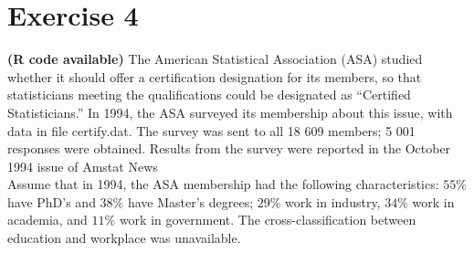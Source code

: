 \documentclass[12pt]{article}
\begin{document}
\section*{Exercise 4}
\textbf{\color{ForestGreen}(R code available)} The American Statistical Association (ASA) studied whether it should offer a certification designation for its members, so that statisticians meeting the qualifications
could be designated as “Certified Statisticians.” In 1994, the ASA surveyed its membership about this issue, with data in file certify.dat. The survey was sent to all 18 609
members; 5 001 responses were obtained. Results from the survey were reported in the October 1994 issue of Amstat News\\
Assume that in 1994, the ASA membership had the following characteristics: $55\%$
have PhD’s and $38\%$ have Master’s degrees; $29\%$ work in industry, $34\%$ work in
academia, and $11\%$ work in government. The cross-classification between education
and workplace was unavailable.
\end{document}
